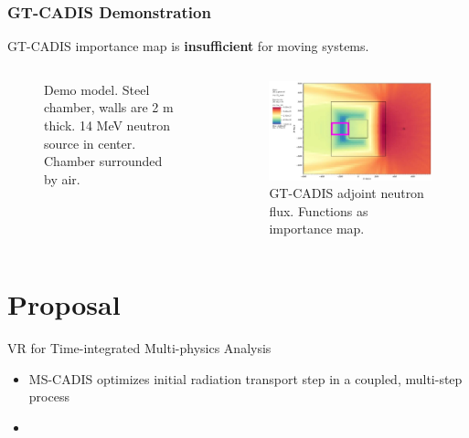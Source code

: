 \documentclass{beamer}
\begin{document}
\begin{frame}
\frametitle{GT-CADIS Demonstration}
	GT-CADIS importance map is \textbf{insufficient} for moving systems.

	\begin{columns}
        \begin{figure}
	\vspace{0.8cm}
		\hspace{-1cm}
		\vspace{-0.3cm}
	\caption{Demo model. Steel chamber, walls are 2 m thick.  14 MeV
		neutron source in center.  Chamber surrounded by air.}
        \end{figure}

        \begin{figure}
	\centering
	\includegraphics[scale=0.20]{gtcadis_adjn_hi.jpg}
		\caption{GT-CADIS adjoint neutron flux. Functions as importance
		map.}
	\end{figure}
	\end{columns}

\end{frame}


\section{Proposal}

\begin{frame}{VR for Time-integrated Multi-physics Analysis}
	\begin{itemize}
		\item{MS-CADIS optimizes initial radiation transport step in a coupled, multi-step
			process}
		\item{}
	\end{itemize}

\end{frame}
\end{document}
